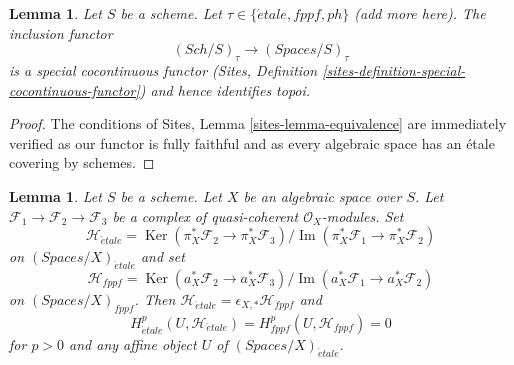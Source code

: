 \documentclass{stacks-project}
\theoremstyle{plain}
\newtheorem{lemma}[subsection]{Lemma}
\theoremstyle{definition}
\theoremstyle{remark}
\numberwithin{equation}{subsection}
\def\Sch{\mathit{Sch}}
\def\etale{{\acute{e}tale}}
\def\Ker{\mathop{\mathrm{Ker}}}
\def\Im{\mathop{\mathrm{Im}}}
\begin{document}
\begin{lemma}
\label{lemma-compare-cohomology-other-topologies}
Let $S$ be a scheme. Let $\tau \in \{\etale, fppf, ph\}$ (add more here).
The inclusion functor
$$
(\Sch/S)_\tau \longrightarrow (\textit{Spaces}/S)_\tau
$$
is a special cocontinuous functor
(Sites, Definition \ref{sites-definition-special-cocontinuous-functor})
and hence identifies topoi.
\end{lemma}

\begin{proof}
The conditions of Sites, Lemma \ref{sites-lemma-equivalence}
are immediately verified as our functor is fully faithful
and as every algebraic space has an \'etale covering by schemes.
\end{proof}

\begin{lemma}
\label{lemma-vanishing-adequate}
Let $S$ be a scheme. Let $X$ be an algebraic space over $S$.
Let $\mathcal{F}_1 \to \mathcal{F}_2 \to \mathcal{F}_3$
be a complex of quasi-coherent $\mathcal{O}_X$-modules.
Set
$$
\mathcal{H}_\etale =
\Ker(\pi_X^*\mathcal{F}_2 \to \pi_X^*\mathcal{F}_3)/
\Im(\pi_X^*\mathcal{F}_1 \to \pi_X^*\mathcal{F}_2)
$$
on $(\textit{Spaces}/X)_\etale$ and set
$$
\mathcal{H}_{fppf} =
\Ker(a_X^*\mathcal{F}_2 \to a_X^*\mathcal{F}_3)/
\Im(a_X^*\mathcal{F}_1 \to a_X^*\mathcal{F}_2)
$$
on $(\textit{Spaces}/X)_{fppf}$.
Then $\mathcal{H}_\etale = \epsilon_{X, *}\mathcal{H}_{fppf}$
and
$$
H^p_\etale(U, \mathcal{H}_\etale) = H^p_{fppf}(U, \mathcal{H}_{fppf}) = 0
$$
for $p > 0$ and any affine object $U$ of $(\textit{Spaces}/X)_\etale$.
\end{lemma}
\end{document}
